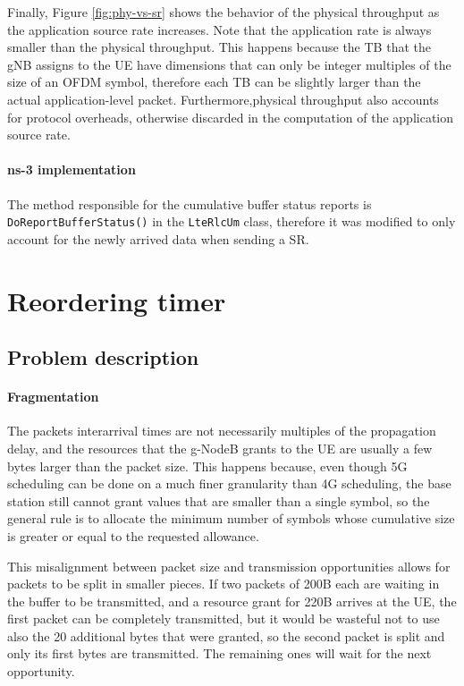 Finally, Figure \ref{fig:phy-vs-sr} shows the behavior of the physical throughput as the application source rate increases. Note that the application rate is always smaller than the physical throughput. This happens because the \ac{TB} that the \ac{gNB} assigns to the \ac{UE} have dimensions that can only be integer multiples of the size of an OFDM symbol, therefore each \ac{TB} can be slightly larger than the actual application-level packet. Furthermore,physical throughput also accounts for protocol overheads, otherwise discarded in the computation of the application source rate.

\paragraph{ns-3 implementation}
The method responsible for the cumulative buffer status reports is \texttt{DoReportBufferStatus()} in the \texttt{LteRlcUm} class, therefore it was modified to only account for the newly arrived data when sending a \ac{SR}.


\section{Reordering timer}
\label{sec:reord-timer}

\subsection{Problem description}
\paragraph{Fragmentation}
The packets interarrival times are not necessarily multiples of the propagation delay, and the resources that the g-NodeB grants to the \ac{UE} are usually a few bytes larger than the packet size. This happens because, even though 5G scheduling can be done on a much finer granularity than 4G scheduling, the base station still cannot grant values that are smaller than a single symbol, so the general rule is to allocate the minimum number of symbols whose cumulative size is greater or equal to the requested allowance.

This misalignment between packet size and transmission opportunities allows for packets to be split in smaller pieces. If two packets of 200B each are waiting in the buffer to be transmitted, and a resource grant for 220B arrives at the \ac{UE}, the first packet can be completely transmitted, but it would be wasteful not to use also the 20 additional bytes that were granted, so the second packet is split and only its first bytes are transmitted. The remaining ones will wait for the next opportunity.

